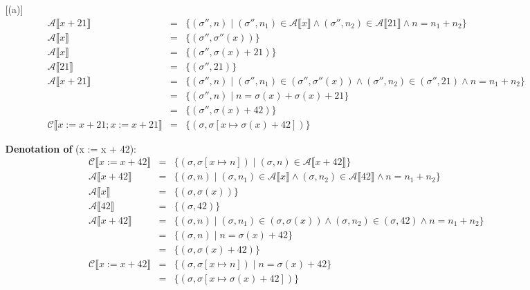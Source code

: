 \documentclass[10pt, oneside]{article}
\begin{document}
\begin{enumerate}[1.]
\begin{enumerate} [(a)]
\begin{eqnarray*}
     \mathcal{A} \llbracket x + 21\rrbracket & = & \{ (\sigma'', n) \mid (\sigma'', n_1) \in \mathcal{A} \llbracket x \rrbracket \wedge (\sigma'', n_2) \in \mathcal{A} \llbracket 21 \rrbracket \wedge n = n_1 + n _2\} \\
       \mathcal{A} \llbracket x \rrbracket  & = & \{ (\sigma'', \sigma''(x)) \} \\
         \mathcal{A} \llbracket x \rrbracket  & = & \{ (\sigma'', \sigma(x) + 21) \} \\
    \mathcal{A} \llbracket 21 \rrbracket  & = & \{ (\sigma'', 21) \} \\
    \mathcal{A} \llbracket x + 21 \rrbracket & = & \{ (\sigma'', n) \mid (\sigma'', n_1) \in (\sigma'', \sigma''(x)) \wedge (\sigma'', n_2) \in (\sigma'', 21) \wedge n = n_1 + n_2 \} \\
    & = & \{ (\sigma'', n) \mid n = \sigma(x) + \sigma(x) + 21 \} \\
    & = & \{ (\sigma'', \sigma(x) + 42) \} \\
    \mathcal{C} \llbracket x := x + 21; x := x + 21 \rrbracket & = & \{(\sigma, \sigma[x \mapsto \sigma(x) + 42 ]) \}
    \end{eqnarray*}

{\bf Denotation of}  (x := x + 42):
      \begin{eqnarray*}  \mathcal{C} \llbracket x := x + 42 \rrbracket & = & \{ (\sigma, \sigma[x \mapsto n]) \mid (\sigma, n) \in \mathcal{A} \llbracket x + 42 \rrbracket \} \\
    \mathcal{A} \llbracket x + 42 \rrbracket & = & \{ (\sigma, n) \mid (\sigma, n_1) \in \mathcal{A} \llbracket x \rrbracket \wedge (\sigma, n_2) \in \mathcal{A} \llbracket 42 \rrbracket \wedge n = n_1 + n _2\} \\
    \mathcal{A} \llbracket x \rrbracket  & = & \{ (\sigma, \sigma(x)) \} \\
    \mathcal{A} \llbracket 42 \rrbracket  & = & \{ (\sigma, 42) \} \\
    \mathcal{A} \llbracket x + 42 \rrbracket & = & \{ (\sigma, n) \mid (\sigma, n_1) \in (\sigma, \sigma(x)) \wedge (\sigma, n_2) \in (\sigma, 42) \wedge n = n_1 + n_2 \} \\
    & = & \{ (\sigma, n) \mid n = \sigma(x) + 42 \} \\
    & = & \{ (\sigma, \sigma(x) + 42) \} \\
     \mathcal{C} \llbracket x := x + 42 \rrbracket & = & \{ (\sigma, \sigma[x \mapsto n]) \mid n = \sigma(x) + 42 \} \\
     & = &  \{ (\sigma, \sigma[x \mapsto \sigma(x) + 42 ])\} \\
   \end{eqnarray*}
   

\end{enumerate}
\end{enumerate}
\end{document}
